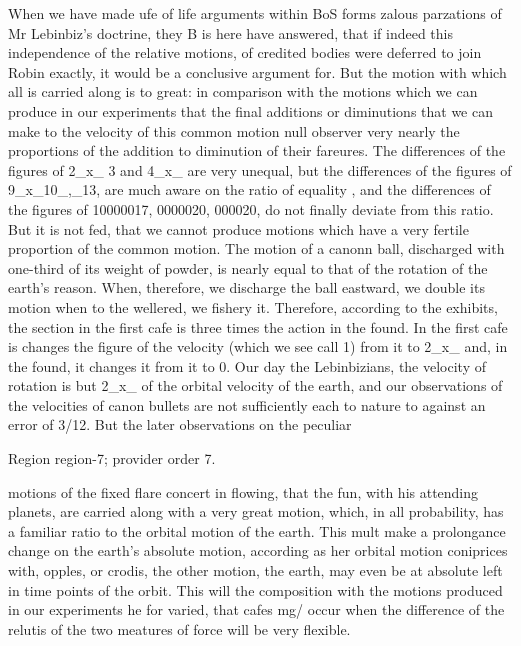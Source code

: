 \documentclass[11pt]{article}
\begin{document}
When we have made ufe of life arguments within BoS forms zalous parzations of Mr Lebinbiz’s doctrine, they B is here have answered, that if indeed this independence of the relative motions, of credited bodies were deferred to join Robin exactly, it would be a conclusive argument for. But the motion with which all is carried along is to great: in comparison with the motions which we can produce in our experiments that the final additions or diminutions that we can make to the velocity of this common motion null observer very nearly the proportions of the addition to diminution of their fareures. The differences of the figures of 2\_x\_ 3 and 4\_x\_ are very unequal, but the differences of the figures of 9\_x\_10\_,\_13, are much aware on the ratio of equality , and the differences of the figures of 10000017, 0000020, 000020, do not finally deviate from this ratio. But it is not fed, that we cannot produce motions which have a very fertile proportion of the common motion. The motion of a canonn ball, discharged with one-third of its weight of powder, is nearly equal to that of the rotation of the earth’s reason. When, therefore, we discharge the ball eastward, we double its motion when to the wellered, we fishery it. Therefore, according to the exhibits, the section in the first cafe is three times the action in the found. In the first cafe is changes the figure of the velocity (which we see call 1) from it to 2\_x\_ and, in the found, it changes it from it to 0. Our day the Lebinbizians, the velocity of rotation is but 2\_x\_ of the orbital velocity of the earth, and our observations of the velocities of canon bullets are not sufficiently each to nature to against an error of 3/12. But the later observations on the peculiar
\par

{\scriptsize\color{gray} Region region-7; provider order 7.\par}
\medskip

motions of the fixed flare concert in flowing, that the fun, with his attending planets, are carried along with a very great motion, which, in all probability, has a familiar ratio to the orbital motion of the earth. This mult make a prolongance change on the earth’s absolute motion, according as her orbital motion coniprices with, opples, or crodis, the other motion, the earth, may even be at absolute left in time points of the orbit. This will the composition with the motions produced in our experiments he for varied, that cafes mg/ occur when the difference of the relutis of the two meatures of force will be very flexible.
\par
\end{document}
